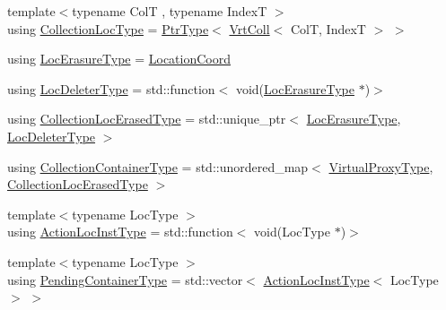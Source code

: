 \begin{DoxyCompactItemize}
\item 
{\footnotesize template$<$typename ColT , typename IndexT $>$ }\\using \hyperlink{structvt_1_1location_1_1_location_manager_aa4b146a9cf55cf5ec92b2b0f5e6d7cf4}{Collection\+Loc\+Type} = \hyperlink{structvt_1_1location_1_1_location_manager_a32d8bca6ed6909a2190286408335d3b4}{Ptr\+Type}$<$ \hyperlink{structvt_1_1location_1_1_location_manager_a189fc3b436520c19aada9623a6b4a42e}{Vrt\+Coll}$<$ ColT, IndexT $>$ $>$
\item 
using \hyperlink{structvt_1_1location_1_1_location_manager_a0c153c55a8938e99fad5386699653220}{Loc\+Erasure\+Type} = \hyperlink{structvt_1_1location_1_1_location_coord}{Location\+Coord}
\item 
using \hyperlink{structvt_1_1location_1_1_location_manager_ab0ce8907fcf9b36cf884af08c744ddb1}{Loc\+Deleter\+Type} = std\+::function$<$ void(\hyperlink{structvt_1_1location_1_1_location_manager_a0c153c55a8938e99fad5386699653220}{Loc\+Erasure\+Type} $\ast$)$>$
\item 
using \hyperlink{structvt_1_1location_1_1_location_manager_a590e246bdfa380ef31e7aee4f4d51442}{Collection\+Loc\+Erased\+Type} = std\+::unique\+\_\+ptr$<$ \hyperlink{structvt_1_1location_1_1_location_manager_a0c153c55a8938e99fad5386699653220}{Loc\+Erasure\+Type}, \hyperlink{structvt_1_1location_1_1_location_manager_ab0ce8907fcf9b36cf884af08c744ddb1}{Loc\+Deleter\+Type} $>$
\item 
using \hyperlink{structvt_1_1location_1_1_location_manager_a03472723aecf57cd99cd221ef2164edb}{Collection\+Container\+Type} = std\+::unordered\+\_\+map$<$ \hyperlink{namespacevt_a1b417dd5d684f045bb58a0ede70045ac}{Virtual\+Proxy\+Type}, \hyperlink{structvt_1_1location_1_1_location_manager_a590e246bdfa380ef31e7aee4f4d51442}{Collection\+Loc\+Erased\+Type} $>$
\item 
{\footnotesize template$<$typename Loc\+Type $>$ }\\using \hyperlink{structvt_1_1location_1_1_location_manager_a6de3841092c537efc5fb8376128bfe18}{Action\+Loc\+Inst\+Type} = std\+::function$<$ void(Loc\+Type $\ast$)$>$
\item 
{\footnotesize template$<$typename Loc\+Type $>$ }\\using \hyperlink{structvt_1_1location_1_1_location_manager_aad005a828c535232cd6b63859b25b171}{Pending\+Container\+Type} = std\+::vector$<$ \hyperlink{structvt_1_1location_1_1_location_manager_a6de3841092c537efc5fb8376128bfe18}{Action\+Loc\+Inst\+Type}$<$ Loc\+Type $>$ $>$
\end{DoxyCompactItemize}
